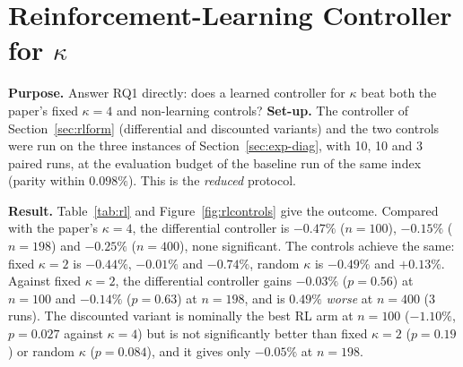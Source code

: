 
\section{Reinforcement-Learning Controller for $\kappa$}\label{sec:exp-rl}

\textbf{Purpose.} Answer RQ1 directly: does a learned controller for $\kappa$ beat both the paper's fixed $\kappa=4$ and non-learning controls? \textbf{Set-up.} The controller of Section~\ref{sec:rlform} (differential and discounted variants) and the two controls were run on the three instances of Section~\ref{sec:exp-diag}, with 10, 10 and 3 paired runs, at the evaluation budget of the baseline run of the same index (parity within $0.098\%$). This is the \emph{reduced} protocol.

\textbf{Result.} Table~\ref{tab:rl} and Figure~\ref{fig:rlcontrols} give the outcome. Compared with the paper's $\kappa=4$, the differential controller is $-0.47\%$ ($n=100$), $-0.15\%$ ($n=198$) and $-0.25\%$ ($n=400$), none significant. The controls achieve the same: fixed $\kappa=2$ is $-0.44\%$, $-0.01\%$ and $-0.74\%$, random $\kappa$ is $-0.49\%$ and $+0.13\%$. Against fixed $\kappa=2$, the differential controller gains $-0.03\%$ ($p=0.56$) at $n=100$ and $-0.14\%$ ($p=0.63$) at $n=198$, and is $0.49\%$ \emph{worse} at $n=400$ (3 runs). The discounted variant is nominally the best RL arm at $n=100$ ($-1.10\%$, $p=0.027$ against $\kappa=4$) but is not significantly better than fixed $\kappa=2$ ($p=0.19$) or random $\kappa$ ($p=0.084$), and it gives only $-0.05\%$ at $n=198$.

